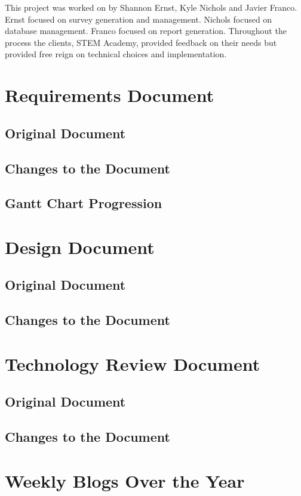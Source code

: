 \documentclass[letterpaper,10pt,serif,draftclsnofoot,onecolumn,compsoc,titlepage]{IEEEtran}
\begin{document}
This project was worked on by Shannon Ernst, Kyle Nichols and Javier Franco.
Ernst focused on survey generation and management. 
Nichols focused on database management.
Franco focused on report generation.
Throughout the process the clients, STEM Academy, provided feedback on their needs but provided free reign on technical choices and implementation. \\

\section{Requirements Document}
\subsection{Original Document}
%
%
\subsection{Changes to the Document}
\subsection{Gantt Chart Progression}

\section{Design Document}
\subsection{Original Document}
\subsection{Changes to the Document}

\section{Technology Review Document}
\subsection{Original Document}
\subsection{Changes to the Document}

\section{Weekly Blogs Over the Year}



\end{document}
